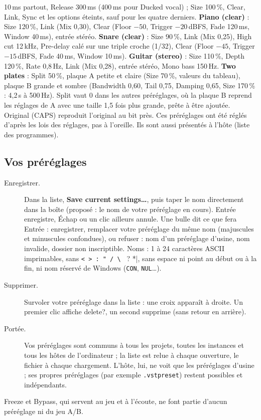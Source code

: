\documentclass[a4paper,11pt]{article}
\newcommand{\ctl}[1]{\textsf{\textbf{#1}}}   %
\newcommand{\dBFS}{\,dBFS}
\begin{document}
10\,ms partout, Release 300\,ms (400\,ms pour Ducked vocal) ; Size 100\,\%, Clear, Link,
Sync et les options éteints, sauf pour les quatre derniers. \textbf{Piano (clear)} : Size 120\,\%,
Link (Mix 0,30), Clear (Floor $-50$, Trigger $-20$\dBFS, Fade 120\,ms, Window 40\,ms), entrée
stéréo. \textbf{Snare (clear)} : Size 90\,\%, Link (Mix 0,25), High cut 12\,kHz, Pre-delay calé
sur une triple croche (1/32), Clear (Floor $-45$, Trigger $-15$\dBFS, Fade 40\,ms, Window
10\,ms). \textbf{Guitar (stereo)} : Size 110\,\%, Depth 120\,\%, Rate 0,8\,Hz, Link (Mix 0,28),
entrée stéréo, Mono bass 150\,Hz. \textbf{Two plates} : Split 50\,\%, plaque A petite et claire
(Size 70\,\%, valeurs du tableau), plaque B grande et sombre (Bandwidth 0,60, Tail 0,75, Damping
0,65, Size 170\,\% : 4,2\,s à 500\,Hz). Split vaut 0 dans les autres préréglages, où la plaque B
reprend les réglages de A avec une taille 1,5 fois plus grande, prête à être ajoutée. \og Original (CAPS)\fg{} reproduit l'original au bit près. Ces
préréglages ont été réglés d'après les lois des réglages, pas à l'oreille. Ils sont aussi
présentés à l'hôte (liste des programmes).

\subsection{Vos préréglages}
\begin{description}
\item[Enregistrer.] Dans la liste, \ctl{Save current settings\ldots}, puis taper le nom
  directement dans la boîte (proposé : le nom de votre préréglage en cours). \textsf{Entrée}
  enregistre, \textsf{Échap} ou un clic ailleurs annule. Une bulle dit ce que fera
  \textsf{Entrée} : enregistrer, remplacer votre préréglage du même nom (majuscules et minuscules
  confondues), ou refuser : nom d'un préréglage d'usine, nom invalide, dossier non inscriptible.
  Noms : 1 à 24 caractères ASCII imprimables, sans \verb|< > : " / \ | ? *|, sans espace ni point
  au début ou à la fin, ni nom réservé de Windows (\texttt{CON}, \texttt{NUL}\ldots).
\item[Supprimer.] Survoler votre préréglage dans la liste : une croix apparaît à droite. Un
  premier clic affiche \og delete?\fg, un second supprime (sans retour en arrière).
\item[Portée.] Vos préréglages sont communs à tous les projets, toutes les instances et tous les
  hôtes de l'ordinateur ; la liste est relue à chaque ouverture, le fichier à chaque chargement.
  L'hôte, lui, ne voit que les préréglages d'usine ; ses propres préréglages (par exemple
  \texttt{.vstpreset}) restent possibles et indépendants.
\end{description}
Freeze et Bypass, qui servent au jeu et à l'écoute, ne font partie d'aucun préréglage ni du jeu
A/B.
\end{document}
